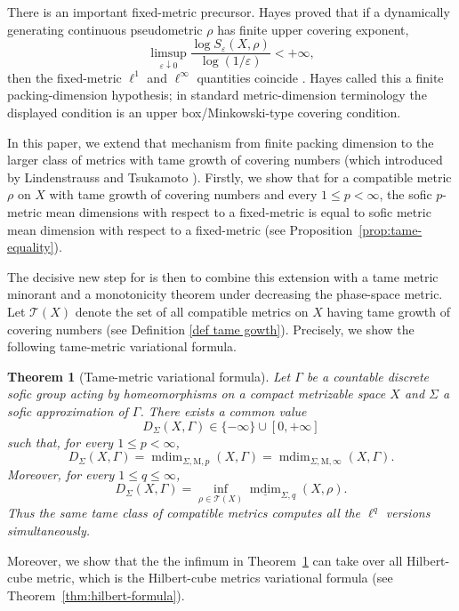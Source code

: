 \documentclass[12pt]{amsart}
\newtheorem{theorem}{Theorem}[section]
\theoremstyle{definition}
\theoremstyle{remark}
\newcommand{\mdim}{\operatorname{mdim}}
\begin{document}
There is an important fixed-metric precursor. Hayes proved that if a dynamically generating continuous pseudometric $\rho$ has finite upper covering exponent,
\[
 \limsup_{\varepsilon\downarrow0}
 \frac{\log S_\varepsilon(X,\rho)}{\log(1/\varepsilon)}<+\infty,
\]
then the fixed-metric $\ell^1$ and $\ell^\infty$ quantities coincide \cite[Proposition 2.20]{Hayes}. Hayes called this a finite packing-dimension hypothesis; in standard metric-dimension terminology the displayed condition is an upper box/Minkowski-type covering condition. 

In this paper, we extend that mechanism from finite packing dimension to the larger class of metrics with tame growth of covering numbers (which introduced by Lindenstrauss and Tsukamoto \cite{LT}). Firstly, we show that for a  compatible metric $\rho$ on $X$ with tame growth of covering numbers and every $1\leq p<\infty$, the sofic 
$p$-metric mean dimensions with respect to a fixed-metric is equal to sofic metric mean dimension with respect to a fixed-metric (see Proposition~\ref{prop:tame-equality}).

The decisive new step for \cite[Question 3]{Hayes} is then to combine this extension with a tame metric minorant and a monotonicity theorem under decreasing the phase-space metric. Let $\mathcal T(X)$ denote the set of all compatible metrics on $X$ having tame growth of covering numbers (see Definition \ref{def tame gowth}). Precisely, we show the following tame-metric variational formula.
\begin{theorem}[Tame-metric variational formula]\label{thm:strengthened}
Let $\Gamma$ be a countable discrete sofic group acting by homeomorphisms on a compact metrizable
space $X$ and $\Sigma$ a sofic approximation of $\Gamma$. There exists a common value
\[
 D_\Sigma(X,\Gamma)\in\{-\infty\}\cup[0,+\infty]
\]
such that, for every $1\leq p<\infty$,
\[
 D_\Sigma(X,\Gamma)
 =\mdim_{\Sigma,\mathrm M,p}(X,\Gamma)
 =\mdim_{\Sigma,\mathrm M,\infty}(X,\Gamma).
 \tag{1.1}
\]
Moreover, for every $1\leq q\leq\infty$,
\[ 
 D_\Sigma(X,\Gamma)
 =\inf_{\rho\in\mathcal T(X)}
 \underline{\mdim}_{\Sigma,q}(X,\rho).
 \tag{1.2}
\]
Thus the same tame class of compatible metrics computes all the $\ell^q$ versions simultaneously.
\end{theorem}

Moreover, we show that the the infimum in Theorem~\ref{thm:strengthened} can take over all Hilbert-cube metric, which is the Hilbert-cube metrics variational formula (see Theorem~\ref{thm:hilbert-formula}).
\end{document}
